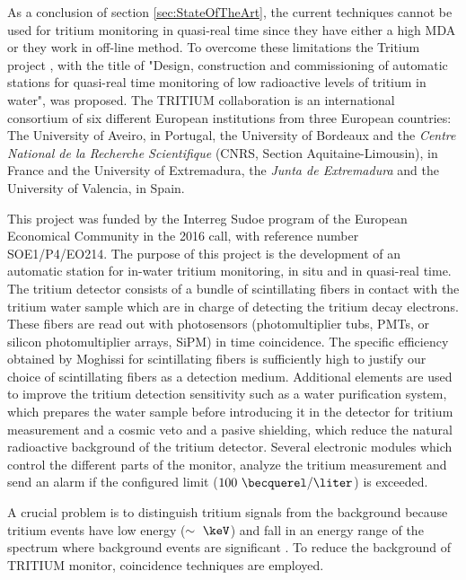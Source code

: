 As a conclusion of section \ref{sec:StateOfTheArt}, the current techniques cannot be used for tritium monitoring in quasi-real time since they have either a high MDA or they work in off-line method. To overcome these limitations the Tritium project \cite{TRITIUM}, with the title of "Design, construction and commissioning of automatic stations for quasi-real time monitoring of low radioactive levels of tritium in water", was proposed. The TRITIUM collaboration is an international consortium of six different European institutions from three European countries: The University of Aveiro, in Portugal, the University of Bordeaux and the \textit{Centre National de la Recherche Scientifique} (CNRS, Section Aquitaine-Limousin), in France and the University of Extremadura, the \textit{Junta de Extremadura} and the University of Valencia, in Spain.

This project was funded by the Interreg Sudoe program of the European Economical Community in the 2016 call, with reference number SOE1/P4/EO214. The purpose of this project is the development of an automatic station for in-water tritium monitoring, in situ and in quasi-real time. The tritium detector consists of a bundle of scintillating fibers in contact with the tritium water sample which are in charge of detecting the tritium decay electrons. These fibers are read out with photosensors (photomultiplier tubs, PMTs, or silicon photomultiplier arrays, SiPM) in time coincidence. The specific efficiency obtained by Moghissi for scintillating fibers is sufficiently high to justify our choice of scintillating fibers as a detection medium. Additional elements are used to improve the tritium detection sensitivity such as a water purification system, which prepares the water sample before introducing it in the detector for tritium measurement and a cosmic veto and a pasive shielding, which reduce the natural radioactive background of the tritium detector. Several electronic modules which control the different parts of the monitor, analyze the tritium measurement and send an alarm if the configured limit ($100~\becquerel/\liter$) is exceeded.

A crucial problem is to distinguish tritium signals from the background because tritium events have low energy ($\sim~\keV$) and fall in an energy range of the spectrum where background events are significant . To reduce the background of TRITIUM monitor, coincidence techniques are employed.


